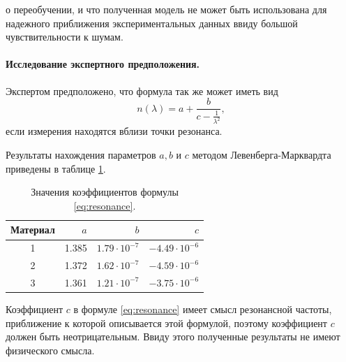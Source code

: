 \documentclass[12pt,a4paper]{article}
\theoremstyle{definition}
\begin{document}
о переобучении, и что полученная модель не может быть
использована для надежного приближения экспериментальных данных ввиду большой чувствительности
к шумам.

\paragraph{Исследование экспертного предположения.}

Экспертом предположено, что формула так же может иметь вид
\begin{equation}
  n(\lambda) = a + \frac{b}{c - \frac{1}{\lambda^2}},
  \label{eq:resonance}
\end{equation}
если измерения находятся вблизи точки резонанса.

Результаты нахождения параметров $a, b$ и $c$ методом Левенберга-Марквардта
приведены в таблице \ref{tabl:resonance_coeffs}.

\begin{table}[h]
  \centering
  \begin{tabular}{| c | r | r | r |} \hline
	Материал	& $a$		& $b$					& $c$					\\ \hline
	1			& 1.385		& $1.79 \cdot 10^{-7}$	& $-4.49 \cdot 10^{-6}$	\\ \hline
	2			& 1.372		& $1.62 \cdot 10^{-7}$	& $-4.59 \cdot 10^{-6}$	\\ \hline
	3			& 1.361		& $1.21 \cdot 10^{-7}$	& $-3.75 \cdot 10^{-6}$	\\ \hline
  \end{tabular}
  \caption{Значения коэффициентов формулы \eqref{eq:resonance}.}
  \label{tabl:resonance_coeffs}
\end{table}

Коэффициент $c$ в формуле \eqref{eq:resonance} имеет смысл резонансной
частоты, приближение к которой описывается этой формулой, поэтому коэффициент
$c$ должен быть неотрицательным. Ввиду этого полученные результаты не
имеют физического смысла.
\end{document}

